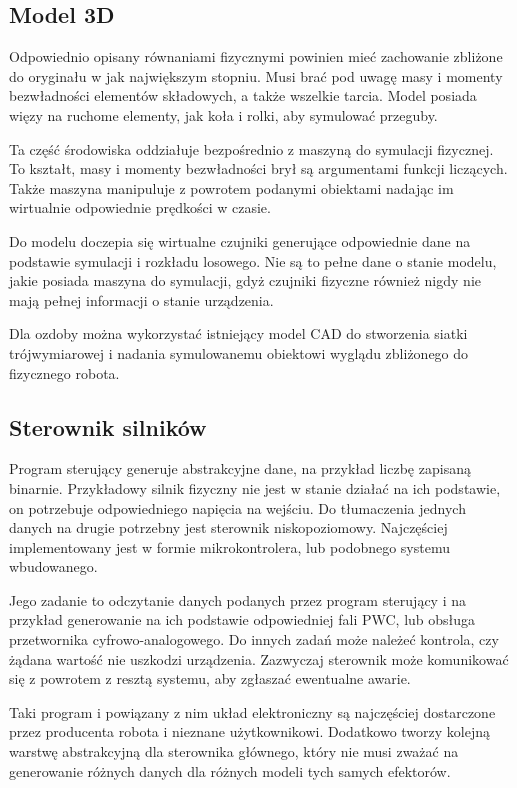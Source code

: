 \subsection{Model 3D}
Odpowiednio opisany równaniami fizycznymi powinien mieć zachowanie zbliżone do oryginału w jak największym stopniu.
Musi brać pod uwagę masy i momenty bezwładności elementów składowych, a także wszelkie tarcia.
Model posiada więzy na ruchome elementy, jak koła i rolki, aby symulować przeguby.

Ta część środowiska oddziałuje bezpośrednio z maszyną do symulacji fizycznej. 
To kształt, masy i momenty bezwładności brył są argumentami funkcji liczących.
Także maszyna manipuluje z powrotem podanymi obiektami nadając im wirtualnie odpowiednie prędkości w czasie.

Do modelu doczepia się wirtualne czujniki generujące odpowiednie dane na podstawie symulacji i rozkładu losowego.
Nie są to pełne dane o stanie modelu, jakie posiada maszyna do symulacji, gdyż czujniki fizyczne również nigdy nie mają pełnej informacji o stanie urządzenia.

Dla ozdoby można wykorzystać istniejący model CAD do stworzenia siatki trójwymiarowej i nadania symulowanemu obiektowi wyglądu zbliżonego do fizycznego robota.

 \subsection{Sterownik silników}
Program sterujący generuje abstrakcyjne dane, na przykład liczbę zapisaną binarnie.
Przykładowy silnik fizyczny nie jest w stanie działać na ich podstawie, on potrzebuje odpowiedniego napięcia na wejściu.
Do tłumaczenia jednych danych na drugie potrzebny jest sterownik niskopoziomowy.
Najczęściej implementowany jest w formie mikrokontrolera, lub podobnego systemu wbudowanego.

Jego zadanie to odczytanie danych podanych przez program sterujący i na przykład generowanie na ich podstawie odpowiedniej fali PWC, lub obsługa przetwornika cyfrowo-analogowego.
Do innych zadań może należeć kontrola, czy żądana wartość nie uszkodzi urządzenia.
Zazwyczaj sterownik może komunikować się z powrotem z resztą systemu, aby zgłaszać ewentualne awarie.

Taki program i powiązany z nim układ elektroniczny są najczęściej dostarczone przez producenta robota i nieznane użytkownikowi.
Dodatkowo tworzy kolejną warstwę abstrakcyjną dla sterownika głównego, który nie musi zważać na generowanie różnych danych dla różnych modeli tych samych efektorów.
 
